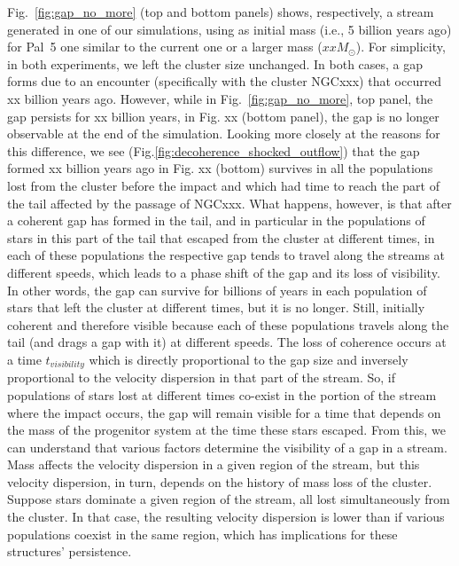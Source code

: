 \documentclass{aa}
\begin{document}
\begin{appendix}
{{Fig.~\ref{fig:gap_no_more} (top and bottom panels) shows, respectively, a stream generated in one of our simulations, using as initial mass (i.e., 5 billion years ago) for Pal~5 one similar to the current one or a larger mass ($xx M_\odot$). For simplicity, in both experiments, we left the cluster size unchanged. In both cases, a gap forms due to an encounter (specifically with the cluster NGCxxx) that occurred xx billion years ago. However, while in Fig.~\ref{fig:gap_no_more}, top panel, the gap persists for xx billion years, in Fig. xx (bottom panel), the gap is no longer observable at the end of the simulation. Looking more closely at the reasons for this difference, we see (Fig.\ref{fig:decoherence_shocked_outflow}) that the gap formed xx billion years ago in Fig. xx (bottom) survives in all the populations lost from the cluster before the impact and which had time to reach the part of the tail affected by the passage of NGCxxx. What happens, however, is that after a coherent gap has formed in the tail, and in particular in the populations of stars in this part of the tail that escaped from the cluster at different times, in each of these populations the respective gap tends to travel along the streams at different speeds, which leads to a phase shift of the gap and its loss of visibility. In other words, the gap can survive for billions of years in each population of stars that left the cluster at different times, but it is no longer. Still, initially coherent and therefore visible because each of these populations travels along the tail (and drags a gap with it) at different speeds. The loss of coherence occurs at a time $t_{visibility}$ which is directly proportional to the gap size and inversely proportional to the velocity dispersion in that part of the stream. So, if populations of stars lost at different times co-exist in the portion of the stream where the impact occurs, the gap will remain visible for a time that depends on the mass of the progenitor system at the time these stars escaped. From this, we can understand that various factors determine the visibility of a gap in a stream. Mass affects the velocity dispersion in a given region of the stream, but this velocity dispersion, in turn, depends on the history of mass loss of the cluster. Suppose stars dominate a given region of the stream, all lost simultaneously from the cluster. In that case, the resulting velocity dispersion is lower than if various populations coexist in the same region, which has implications for these structures' persistence. }}



\end{appendix}
\end{document}

